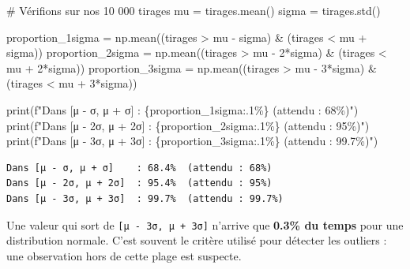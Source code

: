\documentclass[
  french,
  11pt,
  a4paper,
]{scrbook}
\newenvironment{Shaded}{}{}
\newcommand{\BuiltInTok}[1]{\textcolor[rgb]{0.84,0.23,0.29}{#1}}
\newcommand{\CommentTok}[1]{\textcolor[rgb]{0.42,0.45,0.49}{#1}}
\newcommand{\DecValTok}[1]{\textcolor[rgb]{0.00,0.36,0.77}{#1}}
\newcommand{\NormalTok}[1]{\textcolor[rgb]{0.14,0.16,0.18}{#1}}
\newcommand{\OperatorTok}[1]{\textcolor[rgb]{0.14,0.16,0.18}{#1}}
\newcommand{\SpecialCharTok}[1]{\textcolor[rgb]{0.00,0.36,0.77}{#1}}
\newcommand{\SpecialStringTok}[1]{\textcolor[rgb]{0.01,0.18,0.38}{#1}}
\begin{document}
\begin{Shaded}
\begin{Highlighting}[]
\CommentTok{\# Vérifions sur nos 10 000 tirages}
\NormalTok{mu }\OperatorTok{=}\NormalTok{ tirages.mean()}
\NormalTok{sigma }\OperatorTok{=}\NormalTok{ tirages.std()}

\NormalTok{proportion\_1sigma }\OperatorTok{=}\NormalTok{ np.mean((tirages }\OperatorTok{\textgreater{}}\NormalTok{ mu }\OperatorTok{{-}}\NormalTok{ sigma) }\OperatorTok{\&}\NormalTok{ (tirages }\OperatorTok{\textless{}}\NormalTok{ mu }\OperatorTok{+}\NormalTok{ sigma))}
\NormalTok{proportion\_2sigma }\OperatorTok{=}\NormalTok{ np.mean((tirages }\OperatorTok{\textgreater{}}\NormalTok{ mu }\OperatorTok{{-}} \DecValTok{2}\OperatorTok{*}\NormalTok{sigma) }\OperatorTok{\&}\NormalTok{ (tirages }\OperatorTok{\textless{}}\NormalTok{ mu }\OperatorTok{+} \DecValTok{2}\OperatorTok{*}\NormalTok{sigma))}
\NormalTok{proportion\_3sigma }\OperatorTok{=}\NormalTok{ np.mean((tirages }\OperatorTok{\textgreater{}}\NormalTok{ mu }\OperatorTok{{-}} \DecValTok{3}\OperatorTok{*}\NormalTok{sigma) }\OperatorTok{\&}\NormalTok{ (tirages }\OperatorTok{\textless{}}\NormalTok{ mu }\OperatorTok{+} \DecValTok{3}\OperatorTok{*}\NormalTok{sigma))}

\BuiltInTok{print}\NormalTok{(}\SpecialStringTok{f"Dans [μ {-} σ, μ + σ]    : }\SpecialCharTok{\{}\NormalTok{proportion\_1sigma}\SpecialCharTok{:.1\%\}}\SpecialStringTok{  (attendu : 68\%)"}\NormalTok{)}
\BuiltInTok{print}\NormalTok{(}\SpecialStringTok{f"Dans [μ {-} 2σ, μ + 2σ]  : }\SpecialCharTok{\{}\NormalTok{proportion\_2sigma}\SpecialCharTok{:.1\%\}}\SpecialStringTok{  (attendu : 95\%)"}\NormalTok{)}
\BuiltInTok{print}\NormalTok{(}\SpecialStringTok{f"Dans [μ {-} 3σ, μ + 3σ]  : }\SpecialCharTok{\{}\NormalTok{proportion\_3sigma}\SpecialCharTok{:.1\%\}}\SpecialStringTok{  (attendu : 99.7\%)"}\NormalTok{)}
\end{Highlighting}
\end{Shaded}

\begin{verbatim}
Dans [μ - σ, μ + σ]    : 68.4%  (attendu : 68%)
Dans [μ - 2σ, μ + 2σ]  : 95.4%  (attendu : 95%)
Dans [μ - 3σ, μ + 3σ]  : 99.7%  (attendu : 99.7%)
\end{verbatim}

\begin{tcolorbox}[enhanced jigsaw, arc=.35mm, bottomrule=.15mm, bottomtitle=1mm, breakable, colback=white, colbacktitle=quarto-callout-tip-color!10!white, colframe=quarto-callout-tip-color-frame, coltitle=black, left=2mm, leftrule=.75mm, opacityback=0, opacitybacktitle=0.6, rightrule=.15mm, title=\textcolor{quarto-callout-tip-color}{\faLightbulb}\hspace{0.5em}{🧠 À retenir : la détection d'outliers}, titlerule=0mm, toprule=.15mm, toptitle=1mm]

Une valeur qui sort de \texttt{{[}μ\ -\ 3σ,\ μ\ +\ 3σ{]}} n'arrive que
\textbf{0.3\% du temps} pour une distribution normale. C'est souvent le
critère utilisé pour détecter les outliers : une observation hors de
cette plage est suspecte.

\end{tcolorbox}
\end{document}
